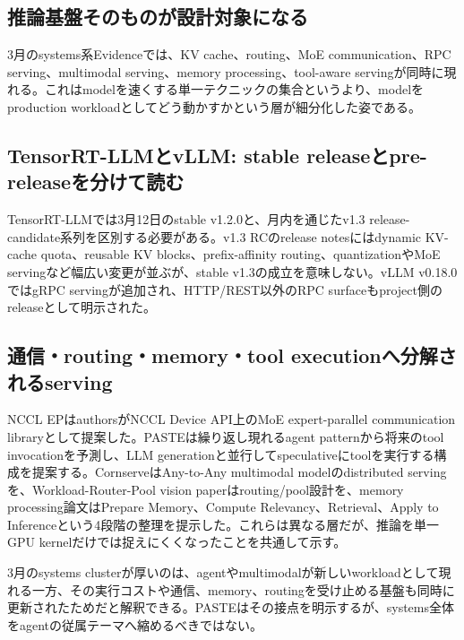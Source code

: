 \begingroup\raggedright
\subsection{推論基盤そのものが設計対象になる}
\par\endgroup

3月のsystems系Evidenceでは、KV cache、routing、MoE communication、RPC serving、multimodal serving、memory processing、tool-aware servingが同時に現れる。これはmodelを速くする単一テクニックの集合というより、modelをproduction workloadとしてどう動かすかという層が細分化した姿である。\autocite{src-361b6111931d,src-3802d01433c1,src-446e2c561111,src-795aff00bd48,src-7e670bf82538,src-b08e40540c2a,src-b6e517afaa35,src-d6cda62f02bb,src-fc697f165940}


\begingroup\raggedright
\subsection{TensorRT-LLMとvLLM: stable releaseとpre-releaseを分けて読む}
\par\endgroup

TensorRT-LLMでは3月12日のstable v1.2.0と、月内を通じたv1.3 release-candidate系列を区別する必要がある。v1.3 RCのrelease notesにはdynamic KV-cache quota、reusable KV blocks、prefix-affinity routing、quantizationやMoE servingなど幅広い変更が並ぶが、stable v1.3の成立を意味しない。vLLM v0.18.0ではgRPC servingが追加され、HTTP/REST以外のRPC surfaceもproject側のreleaseとして明示された。\autocite{src-7e670bf82538,src-b08e40540c2a,src-d6cda62f02bb,src-fc697f165940}


\begingroup\raggedright
\subsection{通信・routing・memory・tool executionへ分解されるserving}
\par\endgroup

NCCL EPはauthorsがNCCL Device API上のMoE expert-parallel communication libraryとして提案した。PASTEは繰り返し現れるagent patternから将来のtool invocationを予測し、LLM generationと並行してspeculativeにtoolを実行する構成を提案する。CornserveはAny-to-Any multimodal modelのdistributed servingを、Workload-Router-Pool vision paperはrouting/pool設計を、memory processing論文はPrepare Memory、Compute Relevancy、Retrieval、Apply to Inferenceという4段階の整理を提示した。これらは異なる層だが、推論を単一GPU kernelだけでは捉えにくくなったことを共通して示す。\autocite{src-361b6111931d,src-3802d01433c1,src-446e2c561111,src-795aff00bd48,src-b6e517afaa35}


3月のsystems clusterが厚いのは、agentやmultimodalが新しいworkloadとして現れる一方、その実行コストや通信、memory、routingを受け止める基盤も同時に更新されたためだと解釈できる。PASTEはその接点を明示するが、systems全体をagentの従属テーマへ縮めるべきではない。\autocite{src-361b6111931d,src-446e2c561111,src-d6cda62f02bb,src-fc697f165940}


